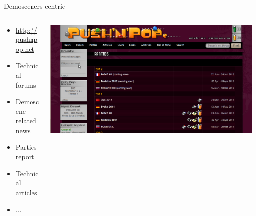 \documentclass{beamer}
\begin{document}
\begin{frame}
\begin{block}{Demosceners centric}
	\begin{columns}
	  \begin{column}{.45\linewidth}
	    \begin{itemize}
	      \onslide \item	  {\large\url{http://pushnpop.net}}
	      \item Technical forums
	      \item Demoscene related news
	      \item Parties report
	      \item Technical articles
	      \item ...
	    \end{itemize}
	  \end{column}
	  \begin{column}{.55\linewidth}
	    \includegraphics[width=\linewidth]{imgs/pnp.png}
	  \end{column}
	\end{columns}
      \end{block}

    \end{frame}
\end{document}
